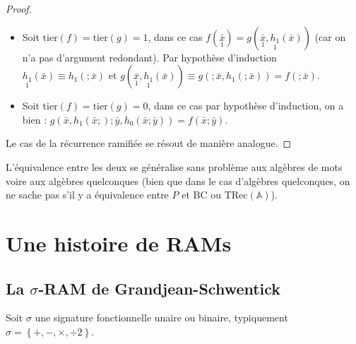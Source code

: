 \documentclass{report}
\newcommand{\TRec}[1]{\text{TRec}\left(\mathbb{#1}\right)}
\begin{document}
\begin{proof}
				\begin{itemize}[itemsep=-1mm]
					\item 	Soit $\text{tier}(f) = \text{tier}(g) = 1$, dans ce cas $f(\underset{1}{\bar{x}}) = g( \underset{1}{\bar{x}}, \underset{1}{h_1}(\bar{x}))$ (car on n'a pas d'argument redondant). Par hypothèse d'induction $\underset{1}{h_1}(\bar{x}) \equiv h_1(;\bar{x})$ et $g(\underset{1}{\bar{x}}, \underset{1}{h_1}(\bar{x})) \equiv g(; \bar{x}, h_1(;\bar{x})) = f(; \bar{x})$.
					
					\item 	Soit $\text{tier}(f) = \text{tier}(g) = 0$, dans ce cas par hypothèse d'induction, on a bien : $g( \bar{x}, h_1(\bar{x};) ; \bar{y}, h_0(\bar{x}; \bar{y})) = f(\bar{x} ; \bar{y})$.
				\end{itemize}
				
				Le cas de la récurrence ramifiée se résout de manière analogue.
			\end{proof}
			
	
			L'équivalence entre les deux se généralise sans problème aux algèbres de mots voire aux algèbres quelconques (bien que dans le cas d'algèbres quelconques, on ne sache pas s'il y a équivalence entre $P$ et $\text{BC}$ ou $\TRec{A}$).
			
		
	\espace
	
	\espace
			
			
	\section{Une histoire de RAMs}
	\label{sec:RAM_story}

	
		\subsection{La $\sigma$-RAM de Grandjean-Schwentick}
		\label{subsec:sigma_RAM}
		
		
		Soit $\sigma$ une signature fonctionnelle unaire ou binaire, typiquement $\sigma = \left\lbrace +, -, \times, \div 2\right\rbrace$. 
		
\end{document}
